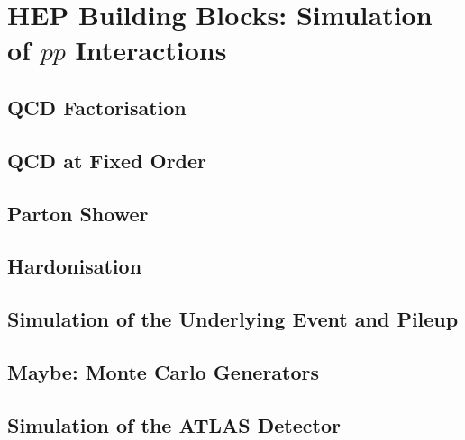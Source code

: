 \chapter{HEP Building Blocks: Simulation of $pp$ Interactions}
\label{chap:simulation}

\section{QCD Factorisation}

\section{QCD at Fixed Order}

\section{Parton Shower}

\section{Hardonisation}

\section{Simulation of the Underlying Event and Pileup}

\section{Maybe: Monte Carlo Generators}

\section{Simulation of the ATLAS Detector}
